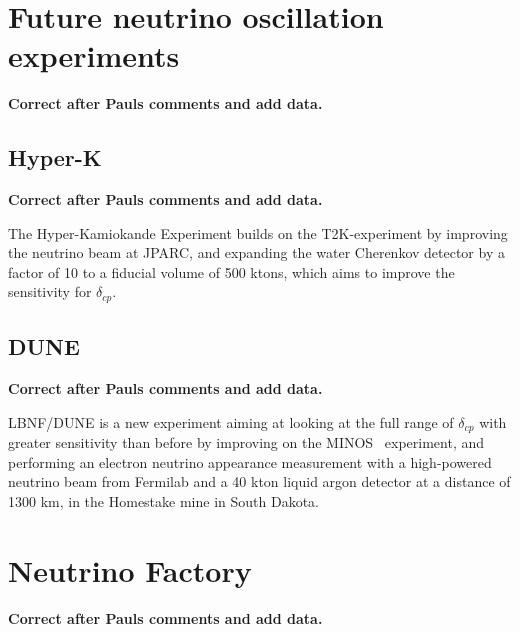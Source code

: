 \section{Future neutrino oscillation experiments}
\textbf{Correct after Pauls comments and add data.}

\subsection{Hyper-K}
\textbf{Correct after Pauls comments and add data.}

The Hyper-Kamiokande Experiment\cite{24HyperK}  builds on the T2K-experiment\cite{21T2K} by improving the neutrino beam at JPARC, and expanding the water Cherenkov detector by a factor of 10 to a fiducial volume of 500 ktons, which aims to improve the sensitivity for $\delta_{cp}$.


\subsection{DUNE}
\textbf{Correct after Pauls comments and add data.}

LBNF/DUNE\cite{23DUNE} is a new experiment aiming at looking at the full range of $\delta_{cp}$ with greater sensitivity than before by improving on the MINOS~\cite{MINOS} experiment, and performing an electron neutrino appearance measurement with a high-powered neutrino beam from Fermilab and a 40 kton liquid argon detector at a distance of 1300 km, in the Homestake mine in South Dakota.

\section{Neutrino Factory}\label{subsec:nuFACT}
\textbf{Correct after Pauls comments and add data.}

